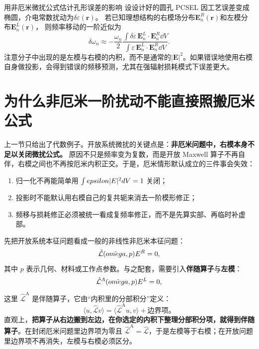 \begin{ApplicationBox}{用非厄米微扰公式估计孔形误差的影响}
设设计好的圆孔 PCSEL 因工艺误差变成椭圆，介电常数扰动为$\delta\varepsilon(\bm{r})$。
若已知理想结构的右模场分布$\bm{E}_n^R(\bm{r})$和左模分布$\bm{E}_n^L(\bm{r})$，
则频率移动的一阶近似为
\[
\delta\omega_n \approx -\frac{\omega_n}{2}\frac{\int\delta\varepsilon\,\bm{E}_n^L\cdot\bm{E}_n^R\dd V}
                                      {\int\varepsilon\,\bm{E}_n^L\cdot\bm{E}_n^R\dd V}.
\]
注意分子中出现的是左模与右模的内积，而不是通常的$|\bm{E}|^2$。如果错误地使用右模自身做投影，会得到错误的频移预测，尤其在强辐射损耗模式下误差更大。
\end{ApplicationBox}
\section{为什么非厄米一阶扰动不能直接照搬厄米公式}
上一节只给出了代数例子。开放系统微扰的关键点是：\textbf{非厄米问题中，右模本身不足以关闭微扰公式。} 原因不只是频率变为复数，而是开放 Maxwell 算子不再自伴，右模之间也不再按厄米内积正交。于是，厄米情形默认成立的三件事会失效：
\begin{enumerate}
  \item 归一化不再能简单用 $\int epsilon |E|^2 d V=1$ 关闭；
  \item 投影时不能默认用右模自己的复共轭来消去一阶模形修正；
  \item 频移与损耗修正必须被统一看成复频率修正，而不是先算实部、再临时补虚部。
\end{enumerate}

先把开放系统本征问题看成一般的非线性非厄米本征问题：
\begin{equation}
\hat{\mathcal L}(\tilde{omega},p)E^{R} = 0,
\label{eq:open_right_mode}
\end{equation}
其中 $p$ 表示几何、材料或工作点参数。与之配套，需要引入\textbf{伴随算子}与\textbf{左模}：
\begin{equation}
\hat{\mathcal L}^{A}(\tilde{omega},p)E^{L} = 0,
\label{eq:open_left_mode}
\end{equation}
这里 $\hat{\mathcal L}^{\mathrm{A}}$ 是伴随算子，它由“内积里的分部积分”定义：
\begin{equation}
\langle u,\hat{\mathcal L}v\rangle = \langle \hat{\mathcal L}^{\mathrm{A}}u, v\rangle + \text{边界项}。
\label{eq:adjoint_def}
\end{equation}
直观上，\textbf{把算子从右边搬到左边，在你选定的内积下整理分部积分项，就得到伴随算子}。在封闭厄米问题里边界项为零且 $\hat{\mathcal L}^{\mathrm{A}}=\hat{\mathcal L}$，于是左模等于右模；在开放问题里边界项不再消失，左模与右模必须区分。

